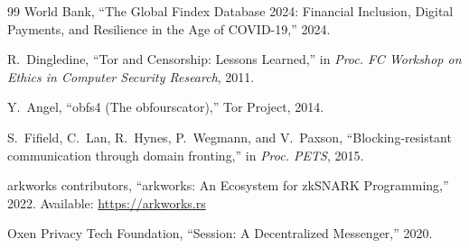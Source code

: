 \documentclass[11pt,a4paper]{article}
\begin{document}
\begin{thebibliography}{99}
World Bank, ``The Global Findex Database 2024: Financial Inclusion, Digital Payments, and Resilience in the Age of COVID-19,'' 2024.

R.~Dingledine, ``Tor and Censorship: Lessons Learned,'' in \textit{Proc. FC Workshop on Ethics in Computer Security Research}, 2011.

Y.~Angel, ``obfs4 (The obfourscator),'' Tor Project, 2014.

S.~Fifield, C.~Lan, R.~Hynes, P.~Wegmann, and V.~Paxson, ``Blocking-resistant communication through domain fronting,'' in \textit{Proc. PETS}, 2015.

arkworks contributors, ``arkworks: An Ecosystem for zkSNARK Programming,'' 2022. Available: \url{https://arkworks.rs}

Oxen Privacy Tech Foundation, ``Session: A Decentralized Messenger,'' 2020.

\end{thebibliography}
\end{document}

